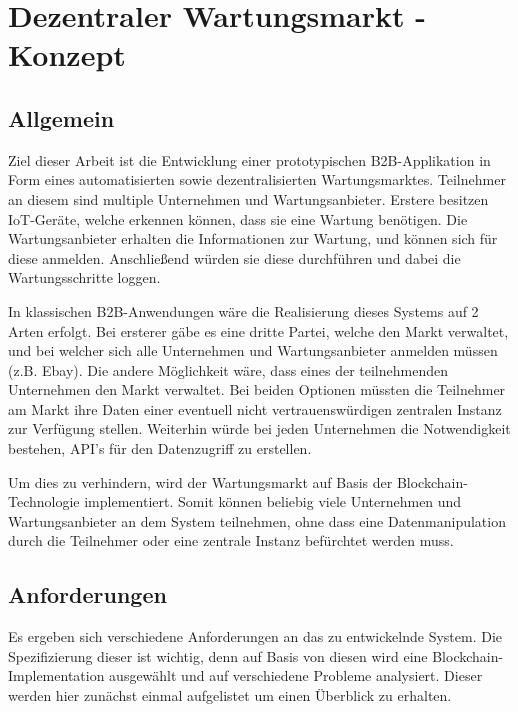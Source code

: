 \chapter{Dezentraler Wartungsmarkt - Konzept}
\label{cha:concept}


\section{Allgemein}
Ziel dieser Arbeit ist die Entwicklung einer prototypischen B2B-Applikation in Form eines automatisierten sowie dezentralisierten Wartungsmarktes. Teilnehmer an diesem sind multiple Unternehmen und Wartungsanbieter. Erstere besitzen IoT-Geräte, welche erkennen können, dass sie eine Wartung benötigen. Die Wartungsanbieter erhalten die Informationen zur Wartung, und können sich für diese anmelden. Anschließend würden sie diese durchführen und dabei die Wartungsschritte loggen.  

In klassischen B2B-Anwendungen wäre die Realisierung dieses Systems auf 2 Arten erfolgt. Bei ersterer gäbe es eine dritte Partei, welche den Markt verwaltet, und bei welcher sich alle Unternehmen und Wartungsanbieter anmelden müssen (z.B. Ebay). Die andere Möglichkeit wäre, dass eines der teilnehmenden Unternehmen den Markt verwaltet. Bei beiden Optionen müssten die Teilnehmer am Markt ihre Daten einer eventuell nicht vertrauenswürdigen zentralen Instanz zur Verfügung stellen. Weiterhin würde bei jeden Unternehmen die Notwendigkeit bestehen, API's für den Datenzugriff zu erstellen.

Um dies zu verhindern, wird der Wartungsmarkt auf Basis der Blockchain-Technologie implementiert. Somit können beliebig viele Unternehmen und Wartungsanbieter an dem System teilnehmen, ohne dass eine Datenmanipulation durch die Teilnehmer oder eine zentrale Instanz befürchtet werden muss.


\section{Anforderungen}
Es ergeben sich verschiedene Anforderungen an das zu entwickelnde System. Die Spezifizierung dieser ist wichtig, denn auf Basis von diesen wird eine Blockchain-Implementation ausgewählt und auf verschiedene Probleme analysiert. Dieser werden hier zunächst einmal aufgelistet um einen Überblick zu erhalten.

